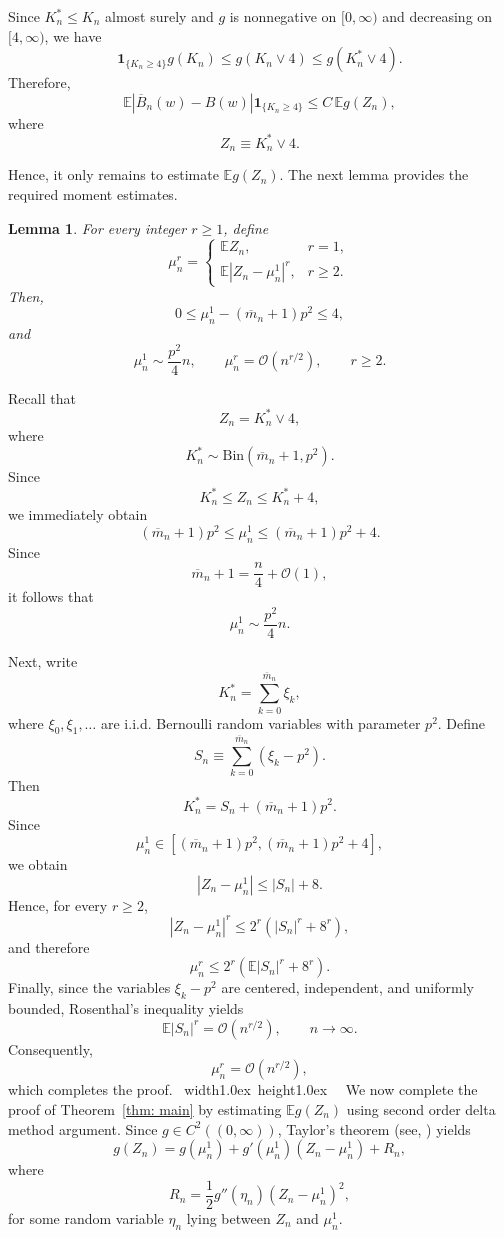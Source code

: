 \documentclass[12pt]{article}
\newcommand{\1}{\mathbf{1}}
\newtheorem{lemma}{Lemma}
\def\endpf{{\ \hfill\hbox{\vrule width1.0ex height1.0ex}\parfillskip 0pt
	}}
\newenvironment{proof}{\noindent{\bf Proof:}}{\endpf}
\begin{document}
Since
$K_n^*\le K_n$
almost surely and
$g$
is nonnegative on $[0,\infty)$ and decreasing on
$[4,\infty)$,
we have
\[
\mathbf1_{\{K_n\ge4\}}
g(K_n)
\le g(K_n\vee4)\le
g(K_n^*\vee4).
\]
Therefore,
\[
\mathbb E
|\overline B_n(w)-B(w)|
\mathbf1_{\{K_n\ge4\}}
\le
C
\,
\mathbb Eg(Z_n),
\]
where
\[
Z_n\equiv K_n^*\vee4.
\]

Hence, it only remains to estimate
$\mathbb Eg(Z_n)$.
The next lemma provides the required moment estimates.

\begin{lemma}\label{lemma: central moments asymptotics}
For every integer
$r\ge1$,
define
\[
\mu_n^r=
\begin{cases}
\mathbb EZ_n,
&
r=1,
\\
\mathbb E|Z_n-\mu_n^1|^r,
&
r\ge2.
\end{cases}
\]
Then,
\[
0
\le
\mu_n^1
-
(\overline m_n+1)p^2
\le
4,
\]
and
\[
\mu_n^1
\sim
\frac{p^2}{4}n,
\qquad
\mu_n^r
=
\mathcal O(n^{r/2}),
\qquad
r\ge2.
\]
\end{lemma}

\begin{proof}
Recall that
\[
Z_n
=
K_n^*\vee4,
\]
where
\[
K_n^*
\sim
\mathrm{Bin}(\overline m_n+1,p^2).
\]
Since
\[
K_n^*
\le
Z_n
\le
K_n^*+4,
\]
we immediately obtain
\[
(\overline m_n+1)p^2
\le
\mu_n^1
\le
(\overline m_n+1)p^2+4.
\]
Since
\[
\overline m_n+1
=
\frac n4+\mathcal O(1),
\]
it follows that
\[
\mu_n^1
\sim
\frac{p^2}{4}n.
\]

Next, write
\[
K_n^*
=
\sum_{k=0}^{\overline m_n}\xi_k,
\]
where
$\xi_0,\xi_1,\ldots$
are i.i.d.
Bernoulli random variables with parameter
$p^2$.
Define
\[
S_n\equiv
\sum_{k=0}^{\overline m_n}
(\xi_k-p^2).
\]
Then
\[
K_n^*
=
S_n
+
(\overline m_n+1)p^2.
\]
Since
\[
\mu_n^1
\in
\left[
(\overline m_n+1)p^2,
(\overline m_n+1)p^2+4
\right],
\]
we obtain
\[
|Z_n-\mu_n^1|
\le
|S_n|+8.
\]
Hence, for every
$r\ge2$,
\[
|Z_n-\mu_n^1|^r
\le
2^r
\left(
|S_n|^r+8^r
\right),
\]
and therefore
\[
\mu_n^r
\le
2^r
\left(
\mathbb E|S_n|^r
+
8^r
\right).
\]
Finally,
since the variables
$\xi_k-p^2$
are centered,
independent,
and uniformly bounded,
Rosenthal's inequality yields
\[
\mathbb E|S_n|^r
=
\mathcal O(n^{r/2}),
\qquad
n\to\infty.
\]
Consequently,
\[
\mu_n^r
=
\mathcal O(n^{r/2}),
\]
which completes the proof.
\end{proof}
$\text{ }$\newline\newline
We now complete the proof of Theorem~\ref{thm: main} by estimating
$\mathbb Eg(Z_n)$ using second order delta method argument.
Since
$g\in C^2((0,\infty))$,
Taylor's theorem (see, \cite[Theorem 1]{Yang2026}) yields
\begin{equation}\label{eq:Taylor}
g(Z_n)
=
g(\mu_n^1)
+
g'(\mu_n^1)(Z_n-\mu_n^1)
+
R_n,
\end{equation}
where
\[
R_n
=
\frac12
g''(\eta_n)
(Z_n-\mu_n^1)^2,
\]
for some random variable
$\eta_n$
lying between
$Z_n$
and
$\mu_n^1$.
\end{document}
